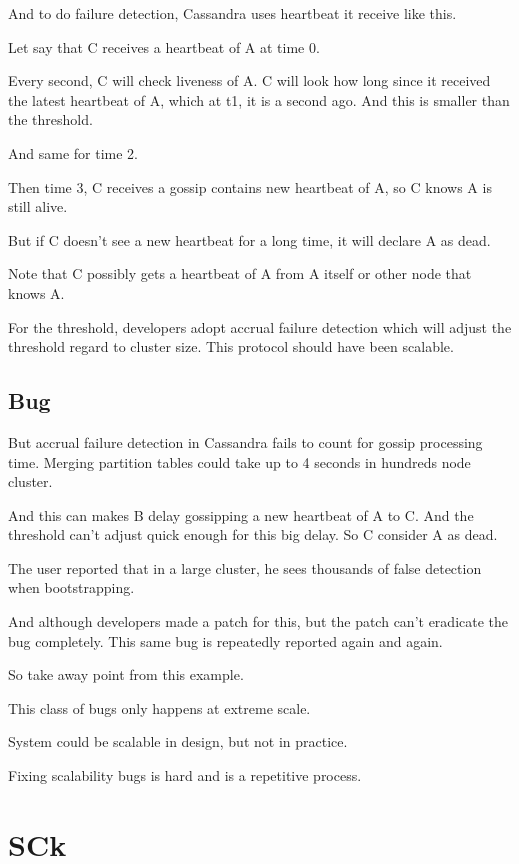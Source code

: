 And to do failure detection, Cassandra uses heartbeat it receive like this.

Let say that C receives a heartbeat of A at time 0.

Every second, C will check liveness of A. C will look how long since it
received the latest heartbeat of A, which at t1, it is a second ago. And this
is smaller than the threshold. 

And same for time 2.

Then time 3, C receives a gossip contains new heartbeat of A, so C knows A is
still alive.

But if C doesn't see a new heartbeat for a long time, it will declare A as dead.

Note that C possibly gets a heartbeat of A from A itself or other node that
knows A.

For the threshold, developers adopt accrual failure detection which will adjust
the threshold regard to cluster size. This protocol should have been scalable.

\subsection{Bug}

But accrual failure detection in Cassandra fails to count for gossip processing
time. Merging partition tables could take up to 4 seconds in hundreds node
cluster.

And this can makes B delay gossipping a new heartbeat of A to C. And the
threshold can't adjust quick enough for this big delay. So C consider A as
dead.

The user reported that in a large cluster, he sees thousands of false detection
when bootstrapping.

And although developers made a patch for this, but the patch can't eradicate the
bug completely. This same bug is repeatedly reported again and again.

So take away point from this example.

This class of bugs only happens at extreme scale.

System could be scalable in design, but not in practice.

Fixing scalability bugs is hard and is a repetitive process.

\section{SCk}

